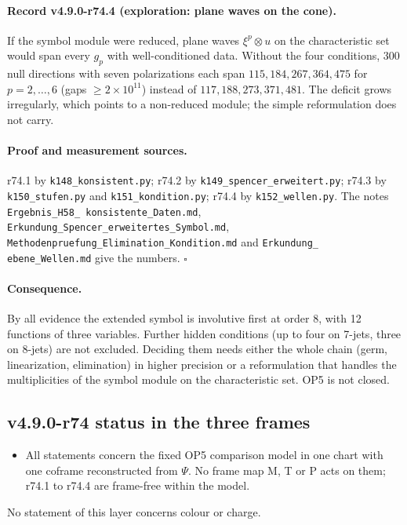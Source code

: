 \paragraph{Record v4.9.0-r74.4 (exploration: plane waves on the cone).}
If the symbol module were reduced, plane waves \(\xi^p\otimes u\) on the characteristic set would span every \(g_p\) with
well-conditioned data.  Without the four conditions, 300 null directions with seven polarizations each span
\(115,184,267,364,475\) for \(p=2,\dots,6\) (gaps \(\ge2\times10^{11}\)) instead of \(117,188,273,371,481\).  The deficit grows
irregularly, which points to a non-reduced module; the simple reformulation does not carry.

\paragraph{Proof and measurement sources.}
r74.1 by \texttt{k148\_konsistent.py}; r74.2 by \texttt{k149\_spencer\_erweitert.py}; r74.3 by \texttt{k150\_stufen.py} and
\texttt{k151\_kondition.py}; r74.4 by \texttt{k152\_wellen.py}.  The notes \texttt{Ergebnis\_H58\_\allowbreak
konsistente\_\allowbreak Daten.md}, \texttt{Erkundung\_\allowbreak Spencer\_\allowbreak erweitertes\_\allowbreak Symbol.md},
\texttt{Methodenpruefung\_\allowbreak Elimination\_\allowbreak Kondition.md} and \texttt{Erkundung\_\allowbreak
ebene\_\allowbreak Wellen.md} give the numbers.  \(\square\)

\paragraph{Consequence.}
By all evidence the extended symbol is involutive first at order 8, with 12 functions of three variables.  Further hidden
conditions (up to four on 7-jets, three on 8-jets) are not excluded.  Deciding them needs either the whole chain (germ,
linearization, elimination) in higher precision or a reformulation that handles the multiplicities of the symbol module on the
characteristic set.  OP5 is not closed.

\subsection*{v4.9.0-r74 status in the three frames}
\label{subsec:v490-r74-frames}

\begin{itemize}[leftmargin=2em]
\item All statements concern the fixed OP5 comparison model in one chart with one coframe reconstructed from \(\Psi\).  No frame
map M, T or P acts on them; r74.1 to r74.4 are frame-free within the model.
\end{itemize}
No statement of this layer concerns colour or charge.

